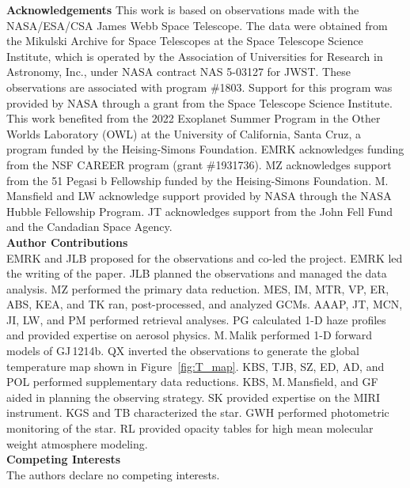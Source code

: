 \documentclass[pdflatex,sn-standardnature]{sn-jnl}%
\begin{document}


\noindent \textbf{Acknowledgements}
\noindent This work is based on observations made with the NASA/ESA/CSA James Webb Space Telescope. The data were obtained from the Mikulski Archive for Space Telescopes at the Space Telescope Science Institute, which is operated by the Association of Universities for Research in Astronomy, Inc., under NASA contract NAS 5-03127 for JWST. These observations are associated with program \#1803. Support for this program was provided by NASA through a grant from the Space Telescope Science Institute.  This work benefited from the 2022 Exoplanet Summer Program in the Other Worlds Laboratory (OWL) at the University of California, Santa Cruz, a program funded by the Heising-Simons Foundation. EMRK acknowledges funding from the NSF CAREER program (grant \#1931736).  MZ acknowledges support from the 51 Pegasi b Fellowship funded by the Heising-Simons Foundation.  M. Mansfield and LW acknowledge support provided by NASA through the NASA Hubble Fellowship Program. JT acknowledges support from the John Fell Fund and the Candadian Space Agency.\\

\noindent \textbf{Author Contributions}\\
EMRK and JLB proposed for the observations and co-led the project.
EMRK led the writing of the paper.
JLB planned the observations and managed the data analysis.
MZ performed the primary data reduction.  
MES, IM, MTR, VP, ER, ABS, KEA, and TK ran, post-processed, and analyzed GCMs.  
AAAP, JT, MCN, JI, LW, and PM performed retrieval analyses.  
PG calculated 1-D haze profiles and provided expertise on aerosol physics. 
M.\,Malik performed \mbox{1-D} forward models of GJ\,1214b.
QX inverted the observations to generate the global temperature map shown in Figure~\ref{fig:T_map}. 
KBS, TJB, SZ, ED, AD, and POL performed supplementary data reductions.  
KBS, M.\,Mansfield, and GF aided in planning the observing strategy.  
SK provided expertise on the MIRI instrument.
KGS and TB characterized the star.
GWH performed photometric monitoring of the star.
RL provided opacity tables for high mean molecular weight atmosphere modeling.\\


\noindent \textbf{Competing Interests}\\
\noindent The authors declare no competing interests.





\end{document}
